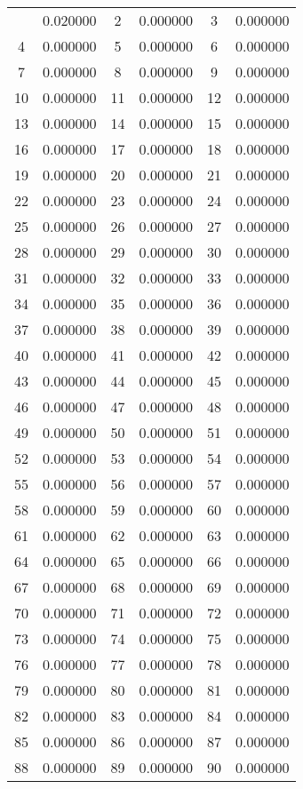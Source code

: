 \documentclass[12pt]{article}
\begin{document}
\begin{longtable}{@{}cc|cc|cc@{}}
\bottomrule
\endlastfoot
1 & 0.020000 & 2 & 0.000000 & 3 & 0.000000 \\
4 & 0.000000 & 5 & 0.000000 & 6 & 0.000000 \\
7 & 0.000000 & 8 & 0.000000 & 9 & 0.000000 \\
10 & 0.000000 & 11 & 0.000000 & 12 & 0.000000 \\
13 & 0.000000 & 14 & 0.000000 & 15 & 0.000000 \\
16 & 0.000000 & 17 & 0.000000 & 18 & 0.000000 \\
19 & 0.000000 & 20 & 0.000000 & 21 & 0.000000 \\
22 & 0.000000 & 23 & 0.000000 & 24 & 0.000000 \\
25 & 0.000000 & 26 & 0.000000 & 27 & 0.000000 \\
28 & 0.000000 & 29 & 0.000000 & 30 & 0.000000 \\
31 & 0.000000 & 32 & 0.000000 & 33 & 0.000000 \\
34 & 0.000000 & 35 & 0.000000 & 36 & 0.000000 \\
37 & 0.000000 & 38 & 0.000000 & 39 & 0.000000 \\
40 & 0.000000 & 41 & 0.000000 & 42 & 0.000000 \\
43 & 0.000000 & 44 & 0.000000 & 45 & 0.000000 \\
46 & 0.000000 & 47 & 0.000000 & 48 & 0.000000 \\
49 & 0.000000 & 50 & 0.000000 & 51 & 0.000000 \\
52 & 0.000000 & 53 & 0.000000 & 54 & 0.000000 \\
55 & 0.000000 & 56 & 0.000000 & 57 & 0.000000 \\
58 & 0.000000 & 59 & 0.000000 & 60 & 0.000000 \\
61 & 0.000000 & 62 & 0.000000 & 63 & 0.000000 \\
64 & 0.000000 & 65 & 0.000000 & 66 & 0.000000 \\
67 & 0.000000 & 68 & 0.000000 & 69 & 0.000000 \\
70 & 0.000000 & 71 & 0.000000 & 72 & 0.000000 \\
73 & 0.000000 & 74 & 0.000000 & 75 & 0.000000 \\
76 & 0.000000 & 77 & 0.000000 & 78 & 0.000000 \\
79 & 0.000000 & 80 & 0.000000 & 81 & 0.000000 \\
82 & 0.000000 & 83 & 0.000000 & 84 & 0.000000 \\
85 & 0.000000 & 86 & 0.000000 & 87 & 0.000000 \\
88 & 0.000000 & 89 & 0.000000 & 90 & 0.000000 \\

\end{longtable}
\end{document}
